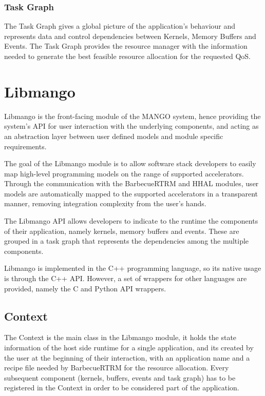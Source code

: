 \subsubsection{Task Graph}

The Task Graph gives a global picture of the application's behaviour and represents data and control dependencies between Kernels, Memory Buffers and Events. The Task Graph provides the resource manager with the information needed to generate the best feasible resource allocation for the requested QoS. \cite{mango_exploring_manycore_architectures}


\section{Libmango}
Libmango is the front-facing module of the MANGO system, hence providing the system's API for user interaction with the underlying components, and acting as an abstraction layer between user defined models and module specific requirements.

The goal of the Libmango module is to allow software stack developers to easily map high-level programming models on the range of supported accelerators. Through the communication with the BarbecueRTRM and HHAL modules, user models are automatically mapped to the supported accelerators in a transparent manner, removing integration complexity from the user's hands.

The Libmango API allows developers to indicate to the runtime the components of their application, namely kernels, memory buffers and events. These are grouped in a task graph that represents the dependencies among the multiple components. 

Libmango is implemented in the C++ programming language, so its native usage is through the C++ API. However, a set of wrappers for other languages are provided, namely the C and Python API wrappers.

\subsection{Context}
The Context is the main class in the Libmango module, it holds the state information of the host side runtime for a single application, and its created by the user at the beginning of their interaction, with an application name and a recipe file needed by BarbecueRTRM for the resource allocation. Every subsequent component (kernels, buffers, events and task graph) has to be registered in the Context in order to be considered part of the application.

